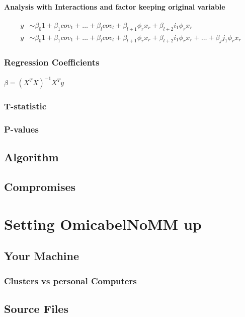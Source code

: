 \documentclass{report}
\begin{document}
\subsubsection{Analysis with Interactions and factor keeping original variable}
\begin{align}
y &\sim\beta_0 1 + \beta_1 cov_1 + \dots + \beta_l cov_l +  \beta_{l+1} \phi_{r} x_r +  \beta_{l+2} i_1 \phi_{r} x_r\\
y &\sim \beta_0 1 + \beta_1 cov_1 + \dots + \beta_l cov_l + \beta_{l+1} \phi_{r} x_r + \beta_{l+2} i_1 \phi_{r} x_r + \dots  + \beta_j j_1 \phi_{r} x_r
\end{align}


\subsection{Regression Coefficients}

$\beta=(X^T X)^{-1} X^T y$

\subsection{T-statistic}
\subsection{P-values}


\section{Algorithm}

\section{Compromises}

\chapter{Setting OmicabelNoMM up}

\section{Your Machine}

\subsection{Clusters vs personal Computers}

\section{Source Files}
\end{document}
